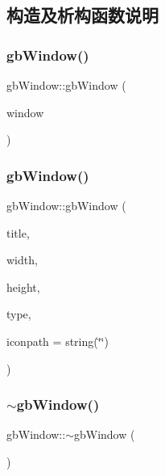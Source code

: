 \subsection{构造及析构函数说明}
\mbox{\label{classgb_window_a08e5afeb1a8c049610b57be380b6403a}} 
\subsubsection{\texorpdfstring{gbWindow()}{gbWindow()}\hspace{0.1cm}{\footnotesize\ttfamily [1/2]}}
{\footnotesize\ttfamily gb\+Window\+::gb\+Window (\begin{DoxyParamCaption}\item[{S\+D\+L\+\_\+\+Window $\ast$}]{window }\end{DoxyParamCaption})}

\mbox{\label{classgb_window_a16cf72cd91e250f47f6b052d66f71d27}} 
\subsubsection{\texorpdfstring{gbWindow()}{gbWindow()}\hspace{0.1cm}{\footnotesize\ttfamily [2/2]}}
{\footnotesize\ttfamily gb\+Window\+::gb\+Window (\begin{DoxyParamCaption}\item[{string}]{title,  }\item[{int}]{width,  }\item[{int}]{height,  }\item[{Uint32}]{type,  }\item[{string}]{iconpath = {\ttfamily string(\char`\"{}\char`\"{})} }\end{DoxyParamCaption})}

\mbox{\label{classgb_window_acd0d49bdf1dbe7df86e02ba82a318571}} 
\subsubsection{\texorpdfstring{$\sim$gbWindow()}{~gbWindow()}}
{\footnotesize\ttfamily gb\+Window\+::$\sim$gb\+Window (\begin{DoxyParamCaption}{ }\end{DoxyParamCaption})}



